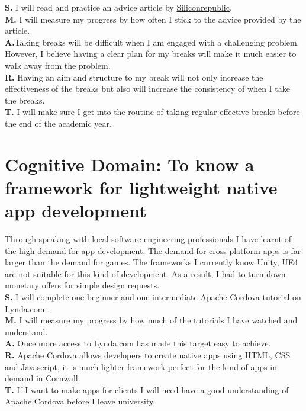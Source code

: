 \documentclass{scrartcl}
\begin{document}
\textbf{S.} I will read and practice an advice article by \href{https://www.siliconrepublic.com/advice/work-breaks-stress-productivity}{Siliconrepublic}.\\
\textbf{M.} I will measure my progress by how often I stick to the advice provided by the article.\\
\textbf{A.}Taking breaks will be difficult when I am engaged with a challenging problem. However, I believe having a clear plan for my breaks will make it much easier to walk away from the problem.\\
\textbf{R.} Having an aim and structure to my break will not only increase the effectiveness of the breaks but also will increase the consistency of when I take the breaks. \\
\textbf{T.} I will make sure I get into the routine of taking regular effective breaks before the end of the academic year. 

\section{Cognitive Domain: To know a framework for lightweight native app development}
 Through speaking with local software engineering professionals I have learnt of the high demand for app development. The demand for cross-platform apps is far larger than the demand for games. The frameworks I currently know Unity, UE4  are not suitable for this kind of development. As a result, I had to turn down monetary offers for simple design requests. \\
\textbf{S.} I will complete one beginner and one intermediate Apache Cordova tutorial on Lynda.com .\\
\textbf{M.} I will measure my progress by how much of the tutorials I have watched and understand.\\
\textbf{A.} Once more access to Lynda.com has made this target easy to achieve.\\
\textbf{R.} Apache Cordova allows developers to create native apps using HTML, CSS and Javascript, it is much lighter framework perfect for the kind of apps in demand in Cornwall.\\
\textbf{T.} If I want to make apps for clients I will need have a good understanding of Apache Cordova before I leave university. \\
\end{document}
